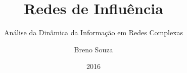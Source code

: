 \title{Redes de Influência}
\subtitle{Análise da Dinâmica da Informação em Redes Complexas}

\author{
  Breno Souza
}

\date{2016}


